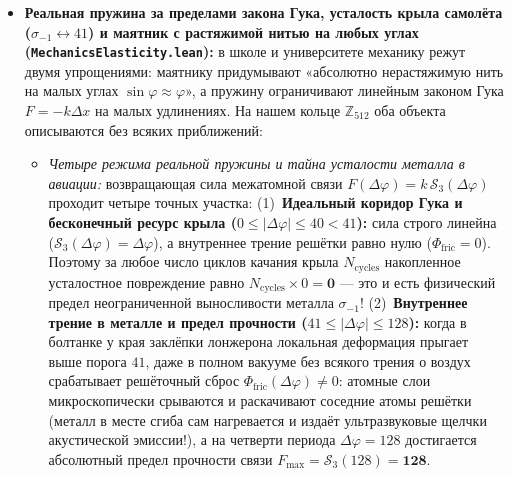 \begin{itemize}[leftmargin=*]
\begin{itemize}[noitemsep]
    (3)~\textbf{Внутренний тяжёлый запорный слой ($Z \in \{74, 79, 82, 83\}$):} вольфрам, золото, свинец или висмут спокойно поглощают уже ослабленный мягкий хвост.
  \item \emph{Активный синфазный купол противофазного стазиса ($833 : 1$):}
    при подаче синфазного удержания $\Delta\varphi_{\mathrm{shield}} = 0$ ($\mathcal{C}_3(0) = +128$, $\mu = K_P = 64$) на 12 катушек резонатора кубооктаэдра фазовый импеданс ворот возрастает в $833$ раза до $D_{\mathrm{shield,\max}} = 833\,\varepsilon = \mathbf{6\,823\,936}$, так что любой внешний радиационный удар $|z_{\mathrm{rad}}| < \frac{41 \times 6\,823\,936}{64} = 4\,371\,584$ после деления на $6\,823\,936$ падает ниже порога $41$ и полностью отсекается мёртвой зоной затвора ($\hat{n}_E \equiv 0$).
  \end{itemize}
\item \textbf{Реальная пружина за пределами закона Гука, усталость крыла самолёта ($\sigma_{-1}\leftrightarrow 41$) и маятник с растяжимой нитью на любых углах (\texttt{MechanicsElasticity.lean}):}
  в школе и университете механику режут двумя упрощениями: маятнику придумывают «абсолютно нерастяжимую нить на малых углах $\sin\varphi\approx\varphi$», а пружину ограничивают линейным законом Гука $F = -k\Delta x$ на малых удлинениях. На нашем кольце $\mathbb{Z}_{512}$ оба объекта описываются без всяких приближений:
  \begin{itemize}[noitemsep]
  \item \emph{Четыре режима реальной пружины и тайна усталости металла в авиации:}
    возвращающая сила межатомной связи $F(\Delta\varphi) = k\,\mathcal{S}_3(\Delta\varphi)$ проходит четыре точных участка:
    (1)~\textbf{Идеальный коридор Гука и бесконечный ресурс крыла ($0 \le |\Delta\varphi| \le 40 < 41$):} сила строго линейна ($\mathcal{S}_3(\Delta\varphi) = \Delta\varphi$), а внутреннее трение решётки равно нулю ($\Phi_{\mathrm{fric}} = 0$). Поэтому за любое число циклов качания крыла $N_{\mathrm{cycles}}$ накопленное усталостное повреждение равно $N_{\mathrm{cycles}}\times 0 = \mathbf{0}$ --- это и есть физический предел неограниченной выносливости металла $\sigma_{-1}$!
    (2)~\textbf{Внутреннее трение в металле и предел прочности ($41 \le |\Delta\varphi| \le 128$):} когда в болтанке у края заклёпки лонжерона локальная деформация прыгает выше порога $41$, даже в полном вакууме без всякого трения о воздух срабатывает решёточный сброс $\Phi_{\mathrm{fric}}(\Delta\varphi) \ne 0$: атомные слои микроскопически срываются и раскачивают соседние атомы решётки (металл в месте сгиба сам нагревается и издаёт ультразвуковые щелчки акустической эмиссии!), а на четверти периода $\Delta\varphi = 128$ достигается абсолютный предел прочности связи $F_{\max} = \mathcal{S}_3(128) = \mathbf{128}$.

\end{itemize}
\end{itemize}
